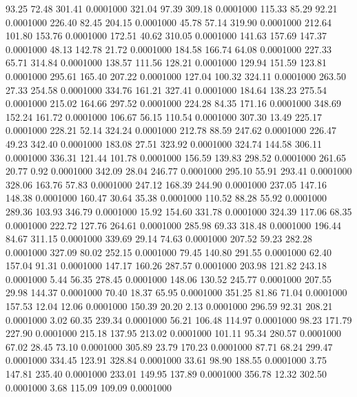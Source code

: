   93.25   72.48  301.41   0.0001000
 321.04   97.39  309.18   0.0001000
 115.33   85.29   92.21   0.0001000
 226.40   82.45  204.15   0.0001000
  45.78   57.14  319.90   0.0001000
 212.64  101.80  153.76   0.0001000
 172.51   40.62  310.05   0.0001000
 141.63  157.69  147.37   0.0001000
  48.13  142.78   21.72   0.0001000
 184.58  166.74   64.08   0.0001000
 227.33   65.71  314.84   0.0001000
 138.57  111.56  128.21   0.0001000
 129.94  151.59  123.81   0.0001000
 295.61  165.40  207.22   0.0001000
 127.04  100.32  324.11   0.0001000
 263.50   27.33  254.58   0.0001000
 334.76  161.21  327.41   0.0001000
 184.64  138.23  275.54   0.0001000
 215.02  164.66  297.52   0.0001000
 224.28   84.35  171.16   0.0001000
 348.69  152.24  161.72   0.0001000
 106.67   56.15  110.54   0.0001000
 307.30   13.49  225.17   0.0001000
 228.21   52.14  324.24   0.0001000
 212.78   88.59  247.62   0.0001000
 226.47   49.23  342.40   0.0001000
 183.08   27.51  323.92   0.0001000
 324.74  144.58  306.11   0.0001000
 336.31  121.44  101.78   0.0001000
 156.59  139.83  298.52   0.0001000
 261.65   20.77    0.92   0.0001000
 342.09   28.04  246.77   0.0001000
 295.10   55.91  293.41   0.0001000
 328.06  163.76   57.83   0.0001000
 247.12  168.39  244.90   0.0001000
 237.05  147.16  148.38   0.0001000
 160.47   30.64   35.38   0.0001000
 110.52   88.28   55.92   0.0001000
 289.36  103.93  346.79   0.0001000
  15.92  154.60  331.78   0.0001000
 324.39  117.06   68.35   0.0001000
 222.72  127.76  264.61   0.0001000
 285.98   69.33  318.48   0.0001000
 196.44   84.67  311.15   0.0001000
 339.69   29.14   74.63   0.0001000
 207.52   59.23  282.28   0.0001000
 327.09   80.02  252.15   0.0001000
  79.45  140.80  291.55   0.0001000
  62.40  157.04   91.31   0.0001000
 147.17  160.26  287.57   0.0001000
 203.98  121.82  243.18   0.0001000
   5.44   56.35  278.45   0.0001000
 148.06  130.52  245.77   0.0001000
 207.55   29.98  144.37   0.0001000
  70.40   18.37   65.95   0.0001000
 351.25   81.86   71.04   0.0001000
 157.53   12.04   12.06   0.0001000
 150.39   20.20    2.13   0.0001000
 296.59   92.31  208.21   0.0001000
   3.02   60.35  239.34   0.0001000
  56.21  106.48  114.97   0.0001000
  98.23  171.79  227.90   0.0001000
 215.18  137.95  213.02   0.0001000
 101.11   95.34  280.57   0.0001000
  67.02   28.45   73.10   0.0001000
 305.89   23.79  170.23   0.0001000
  87.71   68.24  299.47   0.0001000
 334.45  123.91  328.84   0.0001000
  33.61   98.90  188.55   0.0001000
   3.75  147.81  235.40   0.0001000
 233.01  149.95  137.89   0.0001000
 356.78   12.32  302.50   0.0001000
   3.68  115.09  109.09   0.0001000
